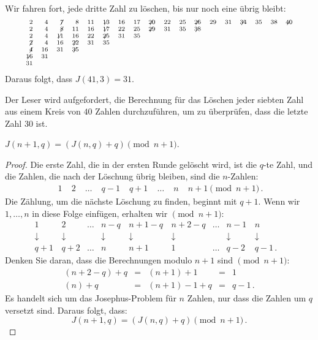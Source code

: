 \begin{example}
\[\begin{array}{rrrrrrrrrrrrrrrrrrrrrrrrrrrr}
\end{array}
\]
Wir fahren fort, jede dritte Zahl zu löschen, bis nur noch eine übrig bleibt:
\[
\begin{scriptsize}
\begin{array}{rrrrrrrrrrrrrrrrrr}
2&4&\not\!7&8&11&\not\!\!13&16&17&\not\!\!20&22&25&\not\!\!26&29&31&\not\!\!34&35&38&\not\!\!40
\\
2&4&\not\!8&11&16&\not\!\!17&22&25&\not\!\!29&31&35&\not\!\!38
\\
2&4&\not\!\!11&16&22&\not\!\!25&31&35
\\
\not\!2&4&16&\not\!\!22&31&35
\\
\not\!4&16&31&\not\!\!35
\\
\not\!\!16&31
\\
31
\end{array}
\end{scriptsize}
\]
Daraus folgt, dass $J(41,3)=31$.
\end{example}

Der Leser wird aufgefordert, die Berechnung für das Löschen jeder siebten Zahl aus einem Kreis von $40$ Zahlen durchzuführen, um zu überprüfen, dass die letzte Zahl $30$ ist.

\begin{theorem}\label{thm.jo1}
$J(n+1,q)=(J(n,q)+q) \pmod {n+1}$.
\end{theorem}

\begin{proof}
Die erste Zahl, die in der ersten Runde gelöscht wird, ist die $q$-te Zahl, und die Zahlen, die nach der Löschung übrig bleiben, sind die $n$-Zahlen:
\[
\begin{array}{rrrrrrrr}
\;1&\;2&\;\ldots&\;q-1&\;q+1&\;\ldots&\;n&\;n+1 \pmod {n+1}\,.
\end{array}
\]
Die Zählung, um die nächste Löschung zu finden, beginnt mit $q+1$. Wenn wir $1,\ldots,n$ in diese Folge einfügen, erhalten wir $\pmod {n\!+\!1}$:
\[
\begin{array}{cccccccccc}
1&\, 2&\ldots& n-q&\, n+1-q&\, n+2-q&\ldots&n-1&\, n&\\
\downarrow&\, \downarrow&&\downarrow&\, \downarrow&\, \downarrow&&\downarrow&\, \downarrow\\
q+1&\, q+2&\ldots&n&\, n+1&\, 1&\ldots&q-2&\, q-1\,.
\end{array}
\]
Denken Sie daran, dass die Berechnungen modulo $n+1$ sind $\pmod {n\!+\!1}$:
\[
\begin{array}{lclcl}
(n+2-q)+q&=& (n+1)+1&=& 1\\
(n)+q&= &(n+1)-1+q&= &q-1\,.
\end{array}
\]
Es handelt sich um das Josephus-Problem für $n$ Zahlen, nur dass die Zahlen um $q$ versetzt sind. Daraus folgt, dass:
\[
J(n+1,q)=(J(n,q)+q) \pmod {n+1}\,.
\]
\end{proof}

